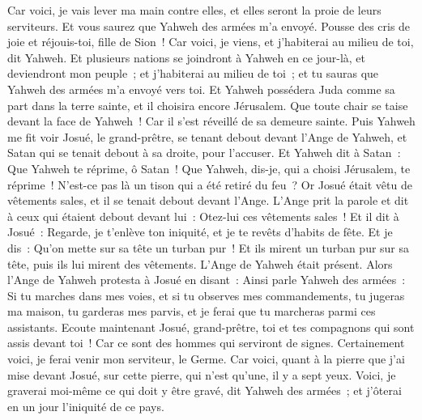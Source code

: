 \begin{multicols}{2}
Car voici, je vais lever ma main contre elles, et elles seront la proie de leurs serviteurs. Et vous saurez que Yahweh des armées m'a envoyé.
Pousse des cris de joie et réjouis-toi, fille de Sion~! Car voici, je viens, et j'habiterai au milieu de toi, dit Yahweh.
Et plusieurs nations se joindront à Yahweh en ce jour-là, et deviendront mon peuple~; et j'habiterai au milieu de toi~; et tu sauras que Yahweh des armées m'a envoyé vers toi.
Et Yahweh possédera Juda comme sa part dans la terre sainte, et il choisira encore Jérusalem.
Que toute chair se taise devant la face de Yahweh~! Car il s'est réveillé de sa demeure sainte.
\VerseOne{}Puis Yahweh me fit voir Josué, le grand-prêtre, se tenant debout devant l'Ange de Yahweh, et Satan qui se tenait debout à sa droite, pour l'accuser.
Et Yahweh dit à Satan~: Que Yahweh te réprime, ô Satan~! Que Yahweh, dis-je, qui a choisi Jérusalem, te réprime~! N'est-ce pas là un tison qui a été retiré du feu~?
Or Josué était vêtu de vêtements sales, et il se tenait debout devant l'Ange.
L'Ange prit la parole et dit à ceux qui étaient debout devant lui~: Otez-lui ces vêtements sales~! Et il dit à Josué~: Regarde, je t'enlève ton iniquité, et je te revêts d'habits de fête.
Et je dis~: Qu'on mette sur sa tête un turban pur~! Et ils mirent un turban pur sur sa tête, puis ils lui mirent des vêtements. L'Ange de Yahweh était présent.
Alors l'Ange de Yahweh protesta à Josué en disant~:
Ainsi parle Yahweh des armées~: Si tu marches dans mes voies, et si tu observes mes commandements, tu jugeras ma maison, tu garderas mes parvis, et je ferai que tu marcheras parmi ces assistants.
Ecoute maintenant Josué, grand-prêtre, toi et tes compagnons qui sont assis devant toi~! Car ce sont des hommes qui serviront de signes. Certainement voici, je ferai venir mon serviteur, le Germe.
Car voici, quant à la pierre que j'ai mise devant Josué, sur cette pierre, qui n'est qu'une, il y a sept yeux. Voici, je graverai moi-même ce qui doit y être gravé, dit Yahweh des armées~; et j'ôterai en un jour l'iniquité de ce pays.

\end{multicols}
